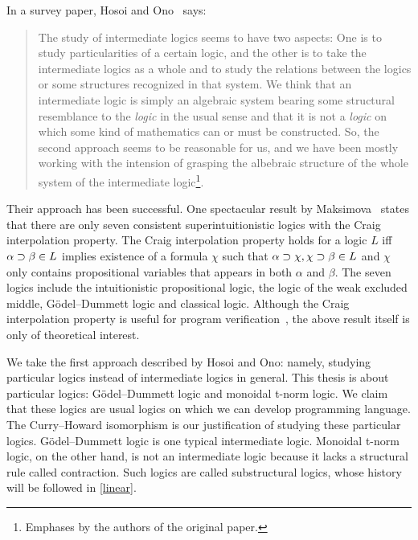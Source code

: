 In a survey paper, Hosoi and Ono~\cite{hosoi-ono} says:
 \begin{quote}
  The study of intermediate logics seems to have two aspects: One is to
  study particularities of a certain logic, and the other is to take the
  intermediate logics as a whole and to study the relations between the
  logics or some structures recognized in that system.  We think that an
  intermediate logic is simply an algebraic system bearing some
  structural resemblance to the \textit{logic} in the usual sense and
  that it is not a \textit{logic} on which some kind of mathematics can
  or must be constructed.  So, the second approach seems to be
  reasonable for us, and we have been mostly working with the intension
  of grasping the albebraic structure of the whole system of the
  intermediate logic\footnote{Emphases by the authors of the original
  paper.}.
 \end{quote}
Their approach has been successful.
One spectacular result by Maksimova~\citep{maksimova77}
states that there are only seven consistent
superintuitionistic logics with the Craig interpolation
property.
The Craig interpolation property holds for a logic $L$ iff $\alpha
\supset\beta\in L$ implies existence of a formula $\chi$ such that
$\alpha\supset\chi, \chi\supset\beta\in L$ and $\chi$ only contains propositional
variables that appears in both $\alpha$ and $\beta$.
The seven logics include the intuitionistic propositional logic, the logic of
the weak excluded middle,
G\"odel--Dummett logic
and classical logic.
Although the Craig interpolation property is useful for program
verification~\citep{mcmillan2003,esparza,unno2009},
the above result itself is only of
theoretical interest.

We take the first approach described by Hosoi and Ono: namely,
studying particular logics instead of intermediate logics in general.
This thesis is about particular logics: G\"odel--Dummett logic and
monoidal t-norm logic.  We claim that these logics are usual logics
on which we can develop programming language.  The Curry--Howard
isomorphism is our justification of studying these particular logics.
G\"odel--Dummett logic is one typical intermediate logic.
Monoidal t-norm logic, on the other hand, is not an intermediate logic
because it lacks a structural rule called contraction.  Such logics are
called substructural logics, whose history will be followed in \ref{linear}.

